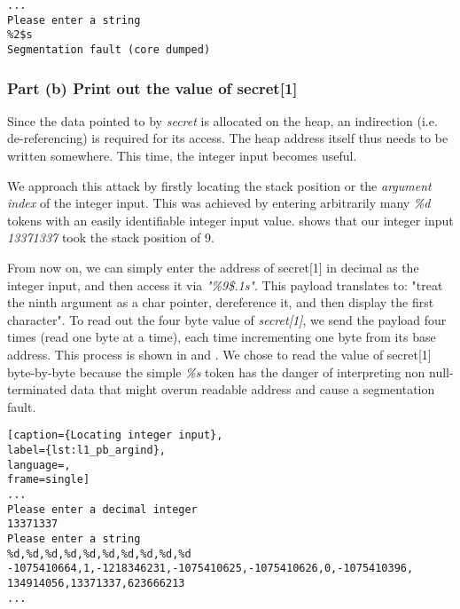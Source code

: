 \begin{minipage}{\linewidth}
\begin{lstlisting}[caption={De-referencing invalid address},
frame=single]
...
Please enter a string
%2$s
Segmentation fault (core dumped)
\end{lstlisting}
\end{minipage}

\subsubsection{Part (b) Print out the value of secret[1]}
Since the data pointed to by \emph{secret} is allocated on the heap, an indirection (i.e. de-referencing) is required for its access. The heap address itself thus needs to be written somewhere. This time, the integer input becomes useful.

We approach this attack by firstly locating the stack position or the \emph{argument index} of the integer input. This was achieved by entering arbitrarily many \emph{\%d} tokens with an easily identifiable integer input value.  shows that our integer input \emph{13371337} took the stack position of 9.

From now on, we can simply enter the address of secret[1] in decimal as the integer input, and then access it via \emph{"\%9\$.1s"}. This payload translates to: "treat the ninth argument as a char pointer, dereference it, and then display the first character". To read out the four byte value of \emph{secret[1]}, we send the payload four times (read one byte at a time), each time incrementing one byte from its base address. This process is shown in  and . We chose to read the value of secret[1] byte-by-byte because the simple \emph{\%s} token has the danger of interpreting non null-terminated data that might overun readable address and cause a segmentation fault.

\begin{minipage}{\linewidth}
\begin{lstlisting}[caption={Locating integer input},
label={lst:l1_pb_argind},
language=,
frame=single]
...
Please enter a decimal integer
13371337
Please enter a string
%d,%d,%d,%d,%d,%d,%d,%d,%d,%d
-1075410664,1,-1218346231,-1075410625,-1075410626,0,-1075410396,
134914056,13371337,623666213
...
\end{lstlisting}
\end{minipage}

